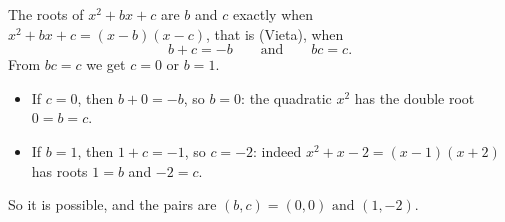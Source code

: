 The roots of $x^2+bx+c$ are $b$ and $c$ exactly when $x^2+bx+c=(x-b)(x-c)$, that is (Vieta), when
\[
b+c=-b\qquad\text{and}\qquad bc=c.
\]
From $bc=c$ we get $c=0$ or $b=1$.
\begin{itemize}
\item If $c=0$, then $b+0=-b$, so $b=0$: the quadratic $x^2$ has the double root $0=b=c$.
\item If $b=1$, then $1+c=-1$, so $c=-2$: indeed $x^2+x-2=(x-1)(x+2)$ has roots $1=b$ and $-2=c$.
\end{itemize}
So it is possible, and the pairs are $\boxed{(b,c)=(0,0)\text{ and }(1,-2)}$.
